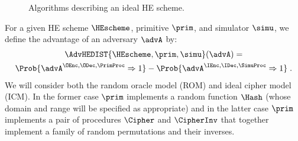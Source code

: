 \begin{figure}[t]
\caption{Algorithms describing an ideal HE scheme.}
\label{fig:sim-def}
\end{figure}

For a given HE scheme $\HEscheme$, primitive $\prim$, and simulator $\simu$,  
we define the advantage of an adversary $\advA$ 
by:
\begin{multline*}
  \AdvHEDIST{\HEscheme,\prim,\simu}(\advA) = \\
        \Prob{\advA^{\OEnc,\ODec,\PrimProc} \Rightarrow 1} 
        - \Prob{\advA^{\IEnc,\IDec,\SimuProc} \Rightarrow 1}  \;.
\end{multline*}
We will consider both the random oracle model (ROM) and 
ideal cipher model (ICM). In the former case $\prim$ implements
a random function $\Hash$ (whose domain and range will be specified as appropriate) 
and in the latter case $\prim$ implements a pair of procedures $\Cipher$ and $\CipherInv$
that together implement a family of random permutations and their inverses.


